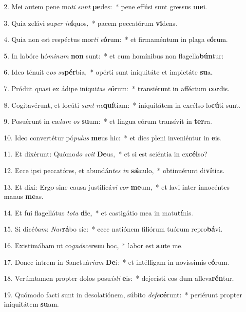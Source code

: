 2. Mei autem pene mo\textit{ti} \textit{sunt} \textbf{pe}des:~*  pene effúsi sunt gressus \textbf{me}i.\

3. Quia zelávi su\textit{per} \textit{in}\textbf{í}quos,~*  pacem peccatórum \textbf{vi}dens.\

4. Quia non est respéctus mor\textit{ti} \textit{e}\textbf{ó}rum:~*  et firmaméntum in plaga e\textbf{ó}rum.\

5. In labóre hó\textit{mi}\textit{num} \textbf{non} sunt:~*  et cum homínibus non flagella\textbf{bún}tur:\

6. Ideo ténuit e\textit{os} \textit{su}\textbf{pér}bia,~*  opérti sunt iniquitáte et impietáte \textbf{su}a.\

7. Pródiit quasi ex ádipe iníqui\textit{tas} \textit{e}\textbf{ó}rum:~*  transiérunt in afféctum \textbf{cor}dis.\

8. Cogitavérunt, et locúti \textit{sunt} \textit{ne}\textbf{quí}tiam:~*  iniquitátem in excélso lo\textbf{cú}ti sunt.\

9. Posuérunt in cæ\textit{lum} \textit{os} \textbf{su}um:~*  et lingua eórum transívit in \textbf{ter}ra.\

10. Ideo convertétur pó\textit{pu}\textit{lus} \textbf{me}us hic:~*  et dies pleni inveniéntur in \textbf{e}is.\

11. Et dixérunt: Quómo\textit{do} \textit{scit} \textbf{De}us,~*  et si est sciéntia in ex\textbf{cél}so?\

12. Ecce ipsi peccatóres, et abundán\textit{tes} \textit{in} \textbf{sǽ}culo,~*  obtinuérunt di\textbf{ví}tias.\

13. Et dixi: Ergo sine causa justificá\textit{vi} \textit{cor} \textbf{me}um,~*  et lavi inter innocéntes manus \textbf{me}as.\

14. Et fui flagellátus \textit{to}\textit{ta} \textbf{di}e,~*  et castigátio mea in matu\textbf{tí}nis.\

15. Si dicé\textit{bam}: \textit{Nar}\textbf{rá}bo sic:~*  ecce natiónem filiórum tuórum repro\textbf{bá}vi.\

16. Existimábam ut co\textit{gnó}\textit{sce}\textbf{rem} hoc,~*  labor est \textbf{an}te me.\

17. Donec intrem in Sanctuá\textit{ri}\textit{um} \textbf{De}i:~*  et intélligam in novíssimis e\textbf{ó}rum.\

18. Verúmtamen propter dolos posu\textit{ís}\textit{ti} \textbf{e}is:~*  dejecísti eos dum alleva\textbf{rén}tur.\

19. Quómodo facti sunt in desolatiónem, súbito \textit{de}\textit{fe}\textbf{cé}runt:~*  periérunt propter iniquitátem \textbf{su}am.\

